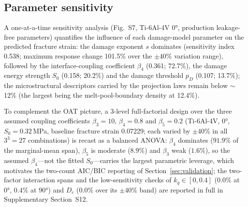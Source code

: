 \subsection{Parameter sensitivity}
\label{sec:sensitivity}
A one-at-a-time sensitivity analysis (Fig.~S7, Ti-6Al-4V $\ang{0}$, production leakage-free parameters) quantifies the influence of each damage-model parameter on the predicted fracture strain: the damage exponent $s$ dominates (sensitivity index 0.538; maximum response change 101.5\% over the $\pm 40\%$ variation range), followed by the interface-coupling coefficient $\beta_4$ (0.361; 72.7\%), the damage energy strength $S_0$ (0.158; 20.2\%) and the damage threshold $p_D$ (0.107; 13.7\%); the microstructural descriptors carried by the projection laws remain below $\sim$12\% (the largest being the melt-pool-boundary density at 12.4\%).

To complement the OAT picture, a $3$-level full-factorial design over the three assumed coupling coefficients $\beta_3 = 10$, $\beta_4 = 0.8$ and $\beta_5 = 0.2$ (Ti-6Al-4V, $\ang{0}$, $S_0 = 0.32$\,MPa, baseline fracture strain 0.07229; each varied by $\pm 40\%$ in all $3^3 = 27$ combinations) is recast as a balanced ANOVA: $\beta_4$ dominates ($91.9\%$ of the marginal-mean span), $\beta_5$ is moderate ($8.9\%$) and $\beta_3$ weak ($1.6\%$), so the assumed $\beta_4$---not the fitted $S_0$---carries the largest parametric leverage, which motivates the two-count AIC/BIC reporting of Section~\ref{sec:validation}; the two-factor interaction spans and the low-sensitivity checks of $k_g\in[0,0.4]$ ($0.0\%$ at $\ang{0}$, $0.4\%$ at $\ang{90}$) and $D_c$ ($0.0\%$ over its $\pm40\%$ band) are reported in full in Supplementary Section~S12.

